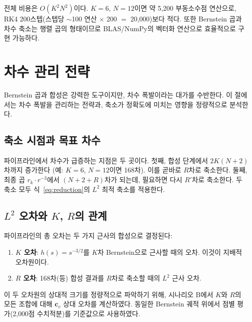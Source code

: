 \documentclass[11pt]{article}
\begin{document}
전체 비용은 $O(K^2 N^2)$이다.
$K=6$, $N=12$이면 약 5,200 부동소수점 연산으로,
RK4 200스텝(스텝당 $\sim$100 연산 $\times$ 200 $=$ 20,000)보다 적다.
또한 Bernstein 곱과 차수 축소는 행렬 곱의 형태이므로
BLAS/NumPy의 벡터화 연산으로 효율적으로 구현 가능하다.

\section{차수 관리 전략}
\label{sec:degree-management}

Bernstein 곱과 합성은 강력한 도구이지만, 차수 폭발이라는 대가를 수반한다.
이 절에서는 차수 폭발을 관리하는 전략과,
축소가 정확도에 미치는 영향을 정량적으로 분석한다.

\subsection{축소 시점과 목표 차수}

파이프라인에서 차수가 급증하는 지점은 두 곳이다.
첫째, 합성 단계에서 $2K(N{+}2)$차까지 증가한다
(예: $K=6$, $N=12$이면 168차).
이를 곧바로 $R$차로 축소한다.
둘째, 최종 곱 $r_k \cdot r^{-3}$에서 $(N{+}2{+}R)$차가 되는데,
필요하면 다시 $R'$차로 축소한다.
두 축소 모두 식~\eqref{eq:reduction}의 $L^2$ 최적 축소를 적용한다.

\subsection{$L^2$ 오차와 $K$, $R$의 관계}
\label{ssec:KR}

파이프라인의 총 오차는 두 가지 근사의 합성으로 결정된다:
\begin{enumerate}
  \item \textbf{$K$ 오차}: $h(s) = s^{-3/2}$를 $K$차 Bernstein으로 근사할 때의 오차.
        이것이 지배적 오차원이다.
  \item \textbf{$R$ 오차}: 168차(등) 합성 결과를 $R$차로 축소할 때의 $L^2$ 근사 오차.
\end{enumerate}

이 두 오차원의 상대적 크기를 정량적으로 파악하기 위해,
시나리오 B에서 $K$와 $R$의 모든 조합에 대해 $\mathbf{c}_v$ 상대 오차를 계산하였다.
동일한 Bernstein 궤적 위에서 점별 평가(2,000점 수치적분)를 기준값으로 사용하였다.
\end{document}

